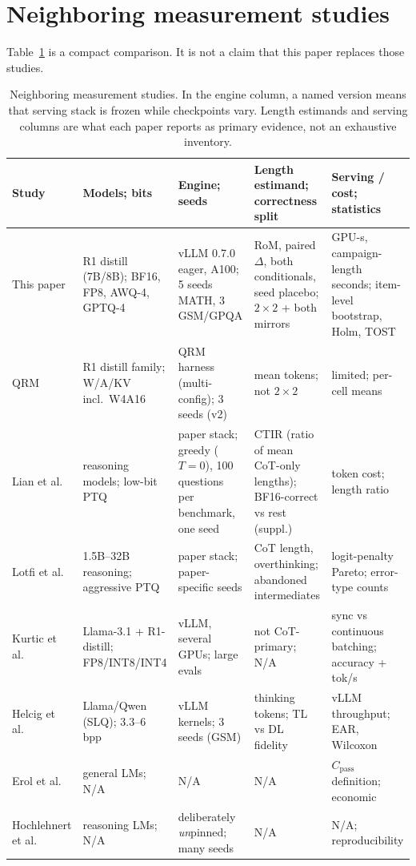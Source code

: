 \documentclass[11pt,a4paper]{article}
\begin{document}
\section{Neighboring measurement studies}
\label{app:related}
Table~\ref{tab:related} is a compact comparison. It is not a claim that this paper replaces those studies.

\begin{table}[t]
\centering
\caption{Neighboring measurement studies. In the engine column, a named version means that serving stack is frozen while checkpoints vary. Length estimands and serving columns are what each paper reports as primary evidence, not an exhaustive inventory.}
\label{tab:related}
\footnotesize
\setlength{\tabcolsep}{4pt}
\renewcommand{\arraystretch}{1.15}
\begin{tabularx}{\textwidth}{@{}>{\raggedright\arraybackslash}p{}*{4}{>{\raggedright\arraybackslash}X}@{}}
\toprule
\textbf{Study} & \textbf{Models; bits} & \textbf{Engine; seeds} & \textbf{Length estimand; correctness split} & \textbf{Serving / cost; statistics} \\
\midrule
This paper & 2 R1 distill (7B/8B); BF16, FP8, AWQ-4, GPTQ-4 & vLLM 0.7.0 eager, A100; 5 seeds MATH, 3 GSM/GPQA & RoM, paired $\Delta$, both conditionals, seed placebo; $2\times 2$ + both mirrors & GPU-s, campaign-length seconds; item-level bootstrap, Holm, TOST \\
QRM~\cite{liu2025qrm} & R1 distill family; W/A/KV incl.\ W4A16 & QRM harness (multi-config); 3 seeds (v2) & mean tokens; not $2\times 2$ & limited; per-cell means \\
Lian et al.~\cite{lian2026quantinflates} & reasoning models; low-bit PTQ & paper stack; greedy ($T=0$), 100 questions per benchmark, one seed & CTIR (ratio of mean CoT-only lengths); BF16-correct vs rest (suppl.) & token cost; length ratio \\
Lotfi et al.~\cite{lotfi2026overthinking} & 1.5B--32B reasoning; aggressive PTQ & paper stack; paper-specific seeds & CoT length, overthinking; abandoned intermediates & logit-penalty Pareto; error-type counts \\
Kurtic et al.~\cite{kurtic2025give} & Llama-3.1 + R1-distill; FP8/INT8/INT4 & vLLM, several GPUs; large evals & not CoT-primary; N/A & sync vs continuous batching; accuracy + tok/s \\
Helcig et al.~\cite{helcig2026slq} & Llama/Qwen (SLQ); 3.3--6 bpp & vLLM kernels; 3 seeds (GSM) & thinking tokens; TL vs DL fidelity & vLLM throughput; EAR, Wilcoxon \\
Erol et al.~\cite{erol2025costofpass} & general LMs; N/A & N/A & N/A & $C_{\mathrm{pass}}$ definition; economic \\
Hochlehnert et al.~\cite{hochlehnert2025sober} & reasoning LMs; N/A & deliberately \emph{un}pinned; many seeds & N/A & N/A; reproducibility \\
\bottomrule
\end{tabularx}
\end{table}
\end{document}
